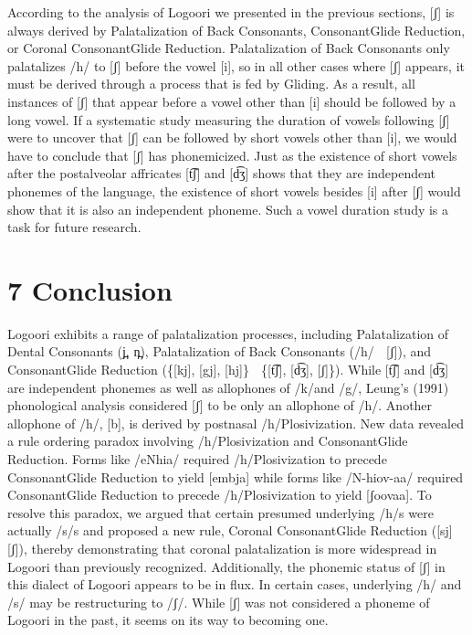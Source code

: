\documentclass[output=paper]{langsci/langscibook}
\begin{document}
According to the analysis of Logoori we presented in the previous sections, [ʃ] is always derived by Palatalization of Back Consonants, ConsonantGlide Reduction, or Coronal ConsonantGlide Reduction. Palatalization of Back Consonants only palatalizes /h/ to [ʃ] before the vowel [i], so in all other cases where [ʃ] appears, it must be derived through a process that is fed by Gliding. As a result, all instances of [ʃ] that appear before a vowel other than [i] should be followed by a long vowel. If a systematic study measuring the duration of vowels following [ʃ] were to uncover that [ʃ] can be followed by short vowels other than [i], we would have to conclude that [ʃ] has phonemicized. Just as the existence of short vowels after the postalveolar affricates [t͡ʃ] and [d͡ʒ] shows that they are independent phonemes of the language, the existence of short vowels besides [i] after [ʃ] would show that it is also an independent phoneme. Such a vowel duration study is a task for future research.

\chapter{7 Conclusion}

Logoori exhibits a range of palatalization processes, including Palatalization of Dental Consonants (j̪, n̪), Palatalization of Back Consonants (/h/  [ʃ]), and ConsonantGlide Reduction (\{[kj], [gj], [hj]\}  \{[t͡ʃ], [d͡ʒ], [ʃ]\}). While [t͡ʃ] and [d͡ʒ] are independent phonemes as well as allophones of /k/and /g/, Leung’s (1991) phonological analysis considered [ʃ] to be only an allophone of /h/. Another allophone of /h/, [b], is derived by postnasal /h/Plosivization. New data revealed a rule ordering paradox involving /h/Plosivization and ConsonantGlide Reduction. Forms like /eNhia/ required /h/Plosivization to precede ConsonantGlide Reduction to yield [embja] while forms like /N-hiov-aa/ required ConsonantGlide Reduction to precede /h/Plosivization to yield [ʃoovaa]. To resolve this paradox, we argued that certain presumed underlying /h/s were actually /s/s and proposed a new rule, Coronal ConsonantGlide Reduction ([sj]  [ʃ]), thereby demonstrating that coronal palatalization is more widespread in Logoori than previously recognized. Additionally, the phonemic status of [ʃ] in this dialect of Logoori appears to be in flux. In certain cases, underlying /h/ and /s/ may be restructuring to /ʃ/. While [ʃ] was not considered a phoneme of Logoori in the past, it seems on its way to becoming one.
\end{document}
